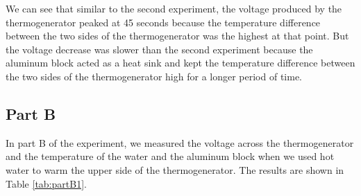 \documentclass[a4paper, 12pt, english]{article}
\begin{document}
We can see that similar to the second experiment, the voltage produced by the
thermogenerator peaked at 45 seconds because the temperature difference between
the two sides of the thermogenerator was the highest at that point. But the
voltage decrease was slower than the second experiment because the aluminum
block acted as a heat sink and kept the temperature difference between the two
sides of the thermogenerator high for a longer period of time.
\subsection{Part B}
In part B of the experiment, we measured the voltage across the thermogenerator
and the temperature of the water and the aluminum block when we used hot water
to warm the upper side of the thermogenerator. The results are shown in Table
\ref{tab:partB1}.
\end{document}
